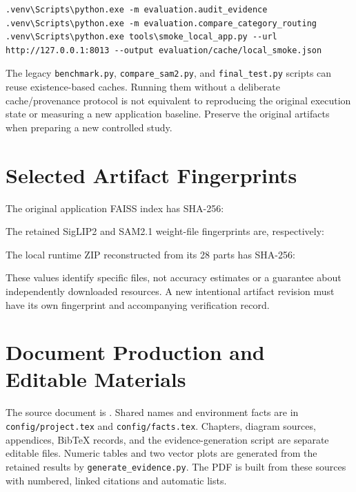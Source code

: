 \begin{lstlisting}
.venv\Scripts\python.exe -m evaluation.audit_evidence
.venv\Scripts\python.exe -m evaluation.compare_category_routing
.venv\Scripts\python.exe tools\smoke_local_app.py --url http://127.0.0.1:8013 --output evaluation/cache/local_smoke.json
\end{lstlisting}

The legacy \texttt{benchmark.py}, \texttt{compare\_sam2.py}, and
\texttt{final\_test.py} scripts can reuse existence-based caches. Running them
without a deliberate cache/provenance protocol is not equivalent to reproducing
the original execution state or measuring a new application baseline. Preserve
the original artifacts when preparing a new controlled study.

\section{Selected Artifact Fingerprints}
The original application FAISS index has SHA-256:
\begin{quote}\small{}\end{quote}
The retained SigLIP2 and SAM2.1 weight-file fingerprints are, respectively:
\begin{quote}\small
{}\par
{}
\end{quote}
The local runtime ZIP reconstructed from its 28 parts has SHA-256:
\begin{quote}\small{}\end{quote}
These values identify specific files, not accuracy estimates or a guarantee
about independently downloaded resources. A new intentional artifact revision
must have its own fingerprint and accompanying verification record.

\section{Document Production and Editable Materials}
The source document is . Shared names and
environment facts are in \texttt{config/project.tex} and \texttt{config/facts.tex}.
Chapters, diagram sources, appendices, BibTeX records, and the evidence-generation
script are separate editable files. Numeric tables and two vector plots are
generated from the retained results by \texttt{generate\_evidence.py}. The PDF
is built from these sources with numbered, linked citations and automatic lists.

